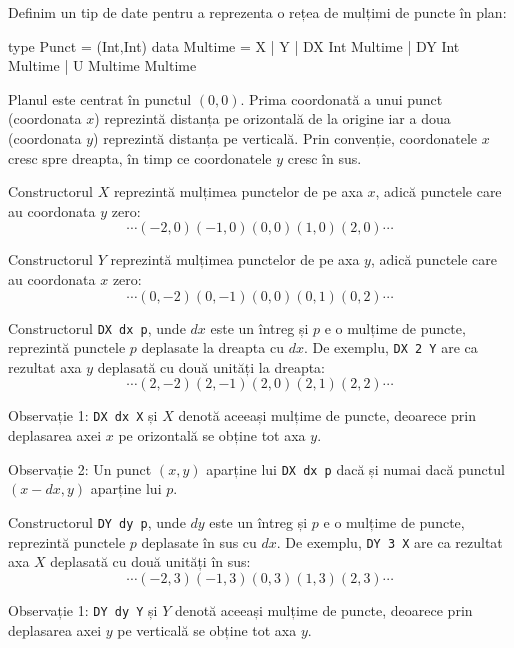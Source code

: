 \documentclass[addpoints,12pt,a4paper]{exam}
\begin{document}
\begin{center}

\end{center}


\begin{questions}

\question[3]
Definim un tip de date pentru a reprezenta o rețea de mulțimi de puncte în plan:
\begin{asciihs}
  type Punct = (Int,Int)
  data Multime = X 
               | Y 
               | DX Int Multime 
               | DY Int Multime 
               | U Multime Multime
\end{asciihs}
Planul este centrat în punctul $(0,0)$.  Prima coordonată a unui punct (coordonata $x$) reprezintă distanța pe orizontală de la origine iar a doua (coordonata $y$) reprezintă distanța pe verticală.  Prin convenție, coordonatele $x$ cresc spre dreapta, în timp ce coordonatele $y$ cresc în sus.  

Constructorul $X$ reprezintă mulțimea punctelor de pe axa $x$, adică punctele care au coordonata $y$ zero:
$$\cdots (-2,0) (-1,0) (0,0) (1,0) (2,0) \cdots$$

Constructorul $Y$ reprezintă mulțimea punctelor de pe axa $y$, adică punctele care au coordonata $x$ zero:
$$\cdots (0,-2) (0,-1) (0,0) (0,1) (0,2) \cdots$$

Constructorul \lstinline$DX dx p$, unde $dx$ este un întreg și $p$ e o mulțime de puncte, reprezintă punctele $p$ deplasate la dreapta cu $dx$. De exemplu, \lstinline$DX 2 Y$ are ca rezultat axa $y$ deplasată cu două unități la dreapta:
$$\cdots (2,-2) (2,-1) (2,0) (2,1) (2,2) \cdots$$

Observație 1:  \lstinline$DX dx X$ și $X$ denotă aceeași mulțime de puncte, deoarece prin deplasarea axei $x$ pe orizontală se obține tot axa $y$.

Observație 2: Un punct $(x,y)$ aparține lui \lstinline$DX dx p$ dacă și numai dacă punctul $(x-dx,y)$ aparține lui $p$.

Constructorul \lstinline$DY dy p$, unde $dy$ este un întreg și $p$ e o mulțime de puncte, reprezintă punctele $p$ deplasate în sus cu $dx$. De exemplu, \lstinline$DY 3 X$ are ca rezultat axa $X$ deplasată cu două unități în sus:
$$\cdots (-2,3) (-1,3) (0,3) (1,3) (2,3) \cdots$$

Observație 1:  \lstinline$DY dy Y$ și $Y$ denotă aceeași mulțime de puncte, deoarece prin deplasarea axei $y$ pe verticală se obține tot axa $y$.


\end{questions}
\end{document}

